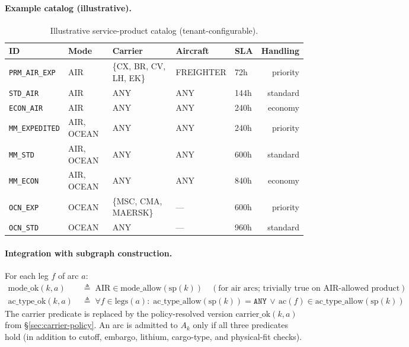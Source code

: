 \documentclass[11pt,a4paper]{article}
\newcommand{\defeq}{\triangleq}
\theoremstyle{definition}
\begin{document}
\paragraph{Example catalog (illustrative).}
\begin{table}[H]
\centering
\caption{Illustrative service-product catalog (tenant-configurable).}
\label{tab:service-product-catalog}
\begin{tabular}{lllllr}
\toprule
ID & Mode & Carrier & Aircraft & SLA & Handling \\
\midrule
\texttt{PRM\_AIR\_EXP} & AIR & \{CX, BR, CV, LH, EK\} & FREIGHTER & 72h & priority \\
\texttt{STD\_AIR} & AIR & ANY & ANY & 144h & standard \\
\texttt{ECON\_AIR} & AIR & ANY & ANY & 240h & economy \\
\texttt{MM\_EXPEDITED} & AIR, OCEAN & ANY & ANY & 240h & priority \\
\texttt{MM\_STD} & AIR, OCEAN & ANY & ANY & 600h & standard \\
\texttt{MM\_ECON} & AIR, OCEAN & ANY & ANY & 840h & economy \\
\texttt{OCN\_EXP} & OCEAN & \{MSC, CMA, MAERSK\} & --- & 600h & priority \\
\texttt{OCN\_STD} & OCEAN & ANY & --- & 960h & standard \\
\bottomrule
\end{tabular}
\end{table}

\paragraph{Integration with subgraph construction.}
For each leg $f$ of arc $a$:
\begin{align}
  \text{mode\_ok}(k, a) \;&\defeq\; \text{AIR} \in \text{mode\_allow}(\text{sp}(k))
    \quad (\text{for air arcs; trivially true on AIR-allowed product})
    \label{eq:sp-mode-ok} \\
  \text{ac\_type\_ok}(k, a) \;&\defeq\;
    \forall f \in \text{legs}(a):\;
    \text{ac\_type\_allow}(\text{sp}(k)) = \texttt{ANY} \,\vee\, \text{ac}(f) \in \text{ac\_type\_allow}(\text{sp}(k))
    \label{eq:sp-ac-ok}
\end{align}
The carrier predicate is replaced by the policy-resolved version
$\text{carrier\_ok}(k, a)$ from \S\ref{sec:carrier-policy}. An arc is admitted
to $A_k$ only if all three predicates hold (in addition to cutoff, embargo,
lithium, cargo-type, and physical-fit checks).
\end{document}
